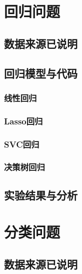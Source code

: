 \documentclass{ds201}
\begin{document}

\makecover




\section{回归问题}


\subsection{数据来源已说明}


\subsection{回归模型与代码}


\subsubsection{线性回归}

\subsubsection{Lasso回归}

\subsubsection{SVC回归}

\subsubsection{决策树回归}

\subsection{实验结果与分析}

\section{分类问题}

\subsection{数据来源已说明}
\end{document}
